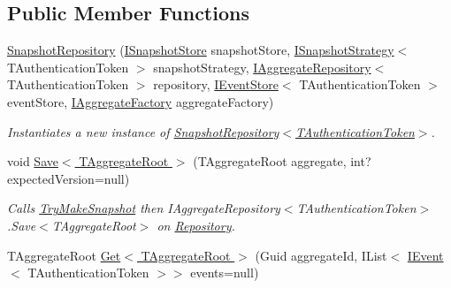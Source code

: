\subsection*{Public Member Functions}
\begin{DoxyCompactItemize}
\item 
\hyperlink{classCqrs_1_1Snapshots_1_1SnapshotRepository_afb7a64a747064d1f1fa1f58e36d05d78_afb7a64a747064d1f1fa1f58e36d05d78}{Snapshot\+Repository} (\hyperlink{interfaceCqrs_1_1Snapshots_1_1ISnapshotStore}{I\+Snapshot\+Store} snapshot\+Store, \hyperlink{interfaceCqrs_1_1Snapshots_1_1ISnapshotStrategy}{I\+Snapshot\+Strategy}$<$ T\+Authentication\+Token $>$ snapshot\+Strategy, \hyperlink{interfaceCqrs_1_1Domain_1_1IAggregateRepository}{I\+Aggregate\+Repository}$<$ T\+Authentication\+Token $>$ repository, \hyperlink{interfaceCqrs_1_1Events_1_1IEventStore}{I\+Event\+Store}$<$ T\+Authentication\+Token $>$ event\+Store, \hyperlink{interfaceCqrs_1_1Domain_1_1Factories_1_1IAggregateFactory}{I\+Aggregate\+Factory} aggregate\+Factory)
\begin{DoxyCompactList}\small\item\em Instantiates a new instance of \hyperlink{classCqrs_1_1Snapshots_1_1SnapshotRepository_afb7a64a747064d1f1fa1f58e36d05d78_afb7a64a747064d1f1fa1f58e36d05d78}{Snapshot\+Repository$<$\+T\+Authentication\+Token$>$}. \end{DoxyCompactList}\item 
void \hyperlink{classCqrs_1_1Snapshots_1_1SnapshotRepository_aac1a574562f8c6134d02a44cd10b8afa_aac1a574562f8c6134d02a44cd10b8afa}{Save$<$ T\+Aggregate\+Root $>$} (T\+Aggregate\+Root aggregate, int? expected\+Version=null)
\begin{DoxyCompactList}\small\item\em Calls \hyperlink{classCqrs_1_1Snapshots_1_1SnapshotRepository_a06b3211ded753ed79c3080819b16d496_a06b3211ded753ed79c3080819b16d496}{Try\+Make\+Snapshot} then I\+Aggregate\+Repository$<$\+T\+Authentication\+Token$>$.\+Save$<$\+T\+Aggregate\+Root$>$ on \hyperlink{classCqrs_1_1Snapshots_1_1SnapshotRepository_a64b1457cd45056fb7affd2aa8cd07d9e_a64b1457cd45056fb7affd2aa8cd07d9e}{Repository}. \end{DoxyCompactList}\item 
T\+Aggregate\+Root \hyperlink{classCqrs_1_1Snapshots_1_1SnapshotRepository_acdbea47afc87de1da613a6eff3ceef0f_acdbea47afc87de1da613a6eff3ceef0f}{Get$<$ T\+Aggregate\+Root $>$} (Guid aggregate\+Id, I\+List$<$ \hyperlink{interfaceCqrs_1_1Events_1_1IEvent}{I\+Event}$<$ T\+Authentication\+Token $>$$>$ events=null)
$$
\end{DoxyCompactItemize}
